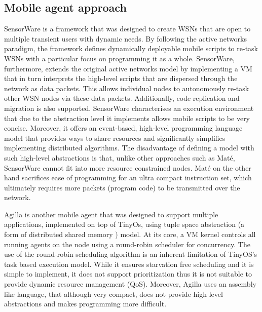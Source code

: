 \subsection{Mobile agent approach}
SensorWare \cite{Boulis03designand} is a framework that was designed to create WSNs that are open to multiple transient users with dynamic needs. By following the active networks paradigm, the framework defines dynamically deployable mobile scripts to re-task WSNs with a particular focus on programming it as a whole. SensorWare, furthermore, extends the original active networks model by implementing a VM that in turn interprets the high-level scripts that are dispersed through the network as data packets. This allows individual nodes to autonomously re-task other WSN nodes via these data packets. Additionally, code replication and migration is also supported. SensorWare characterises an execution environment that due to the abstraction level it implements allows mobile scripts to be very concise. Moreover, it offers an event-based, high-level programming language model that provides ways to share resources and significantly simplifies implementing distributed algorithms. The disadvantage of defining a model with such high-level abstractions is that, unlike other approaches such as Maté, SensorWare cannot fit into more resource constrained nodes. Maté on the other hand sacrifices ease of programming for an ultra compact instruction set, which ultimately requires more packets (program code) to be transmitted over the network. 

Agilla is another mobile agent that was designed to support multiple applications, implemented on top of TinyOs, using tuple space abstraction (a form of distributed shared memory \cite{Carriero:1989:LC:63334.63337}) model. At its core, a VM kernel controls all running agents on the node using a round-robin scheduler for concurrency. The use of the round-robin scheduling algorithm is an inherent limitation of TinyOS's task based execution model. While it ensures starvation free scheduling and it is simple to implement, it does not support prioritization thus it is not suitable to provide dynamic resource management (QoS). Moreover, Agilla uses an assembly like language, that although very compact, does not provide high level abstractions and makes programming more difficult. 

